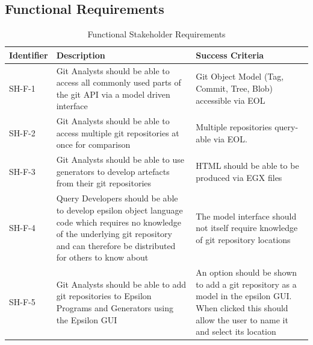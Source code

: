 \documentclass[11pt]{book}
\begin{document}
\subsection{Functional Requirements}
\begin{table}[H]
\centering
\begin{longtable}{|p{2cm}|p{7cm}|p{6cm}|}
\hline
\textbf{Identifier} & \textbf{Description} & \textbf{Success Criteria} \\ \hline
SH-F-1 & Git Analysts should be able to access all commonly used parts of the git API via a model driven interface &  Git Object Model (Tag, Commit, Tree, Blob) accessible via EOL \\ \hline
SH-F-2 & Git Analysts should be able to access multiple git repositories at once for comparison & Multiple repositories query-able via EOL.  \\ \hline
SH-F-3 & Git Analysts should be able to use generators to develop artefacts from their git repositories & HTML should be able to be produced via EGX files \\ \hline
SH-F-4 & Query Developers should be able to develop epsilon object language code which requires no knowledge of the underlying git repository and can therefore be distributed for others to know about & The model interface should not itself require knowledge of git repository locations \\ \hline
SH-F-5 & Git Analysts should be able to add git repositories to Epsilon Programs and Generators using the Epsilon GUI & An option should be shown to add a git repository as a model in the epsilon GUI. When clicked this should allow the user to name it and select its location \\ \hline
\end{longtable}
\caption{Functional Stakeholder Requirements}
\label{tab:functionalstakeholderrequirements}
\end{table}
\end{document}
